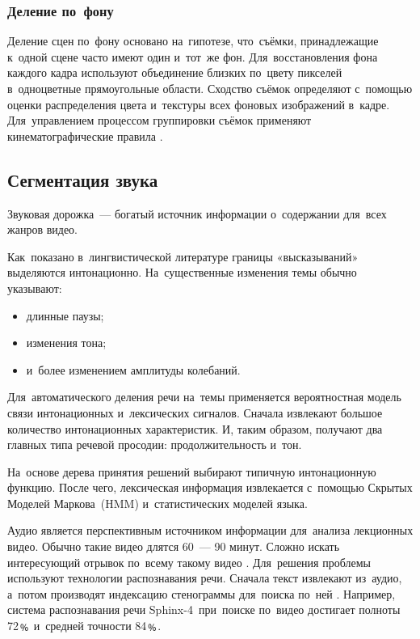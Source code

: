 \subsubsection{Деление по~фону}

Деление сцен по~фону основано на~гипотезе, что~съёмки,
принадлежащие к~одной сцене часто имеют один и~тот~же фон.
Для~восстановления фона каждого кадра используют объединение
близких по~цвету пикселей в~одноцветные прямоугольные области.
Сходство съёмок определяют с~помощью оценки распределения
цвета и~текстуры всех фоновых изображений в~кадре.
Для~управлением процессом группировки съёмок
применяют кинематографические правила \cite{Chen:2008}.

\subsection{Сегментация звука}

Звуковая дорожка~— богатый источник информации
о~содержании для~всех жанров видео.

Как~показано в~лингвистической литературе границы «высказываний»
выделяются интонационно.
На~существенные изменения темы обычно указывают:
\begin{itemize}
    \item длинные паузы;
    \item изменения тона;
    \item и~более изменением амплитуды колебаний.
\end{itemize}

Для~автоматического деления речи на~темы
применяется вероятностная модель связи интонационных
и~лексических сигналов.
Сначала извлекают большое количество интонационных характеристик.
И, таким образом, получают два главных типа речевой просодии:
продолжительность и~тон.

На~основе дерева принятия решений выбирают
типичную интонационную функцию.
После чего, лексическая информация извлекается
с~помощью Скрытых Моделей
Маркова\ (HMM)
и~статистических моделей языка.

Аудио является перспективным источником информации
для~анализа лекционных видео.
Обычно такие видео длятся 60~— 90 минут.
Сложно искать интересующий отрывок по~всему такому видео \cite{Repp:2008}.
Для~решения проблемы используют технологии
распознавания речи.
Сначала текст извлекают из~аудио,
а~потом производят индексацию стенограммы для~поиска по~ней \cite{Kumar:2011}.
Например, система распознавания речи Sphinx-4\ при~поиске
по~видео достигает полноты 72﹪ и~средней точности 84﹪.

